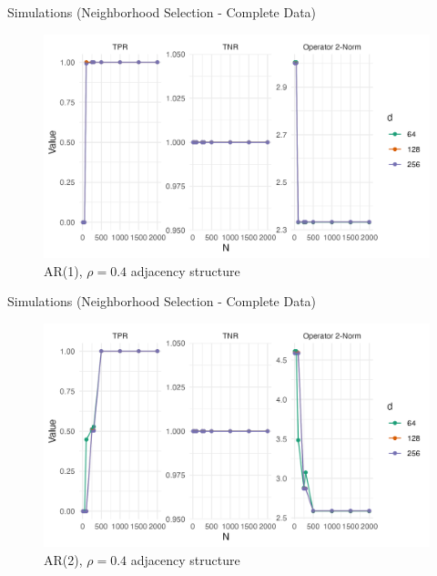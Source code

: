 \documentclass{beamer}
\begin{document}
\begin{frame}{Simulations (Neighborhood Selection - Complete Data)}
    \begin{figure}
        \centering 
        \includegraphics[scale=0.65]{glasso_complete_fixN_b1mb.png}
        \caption{AR(1), $\rho=0.4$ adjacency structure}
    \end{figure}
\end{frame}


\begin{frame}{Simulations (Neighborhood Selection - Complete Data)}
    \begin{figure}
        \centering 
        \includegraphics[scale=0.65]{glasso_complete_fixN_b2mb.png}
        \caption{AR(2), $\rho=0.4$ adjacency structure}
    \end{figure}
\end{frame}
\end{document}
